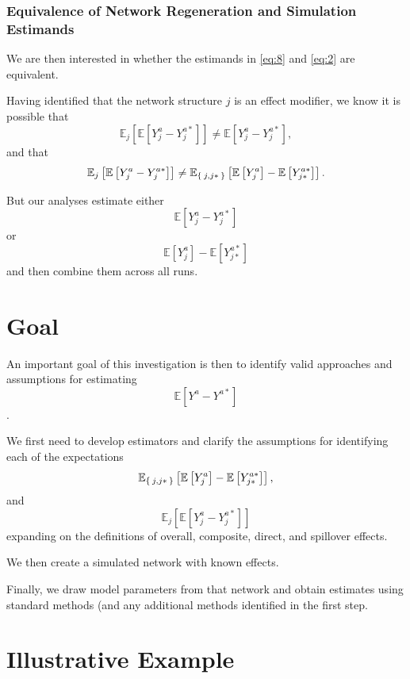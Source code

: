 \documentclass{article}
\theoremstyle{definition}
\begin{document}
\subsubsection{Equivalence of Network Regeneration and Simulation Estimands}
We are then interested in whether the estimands in \ref{eq:8} and \ref{eq:2} are equivalent.

Having identified that the network structure $j$ is an effect modifier, we know it is possible that \begin{equation}
    \mathbb{E}_{j}\left[\mathbb{E}\left[Y_{j}^{a}-Y_{j}^{a*}\right]\right] \neq \mathbb{E}\left[Y_{j}^{a}-Y_{j}^{a*}\right],
\end{equation}
and that
\begin{equation}
    \mathbb{E}_{j}\left[\mathbb{E}\left[Y_{j}^{a}-Y_{j}^{a*}\right]\right]\neq  \mathbb{E}_{\Set{j,j*}}\left[\mathbb{E}\left[Y_{j}^{a}\right]-\mathbb{E}\left[Y_{j*}^{a*}\right]\right]. 
\end{equation}

But our analyses estimate either 
\begin{equation*}
\mathbb{E}\left[Y_{j}^{a}-Y_{j}^{a*}\right]    
\end{equation*}
or 
\begin{equation*}
    \mathbb{E}\left[Y_{j}^{a}\right]-\mathbb{E}\left[Y_{j*}^{a*}\right]
\end{equation*}
and then combine them across all runs.
\section{Goal}
An important goal of this investigation is then to identify valid approaches and assumptions for estimating $$\mathbb{E}\left[Y^{a}-Y^{a*}\right]$$.

We first need to develop estimators and clarify the assumptions for identifying each of the expectations $$\mathbb{E}_{\Set{j,j*}}\left[\mathbb{E}\left[Y_{j}^{a}\right]-\mathbb{E}\left[Y_{j*}^{a*}\right]\right],$$ and
$$\mathbb{E}_{j}\left[\mathbb{E}\left[Y_{j}^{a}-Y_{j}^{a*}\right]\right]$$ expanding on the definitions of overall, composite, direct, and spillover effects.

We then create a simulated network with known effects.

Finally, we draw model parameters from that network and obtain estimates using standard methods (and any additional methods identified in the first step.
\section{Illustrative Example}
\end{document}
